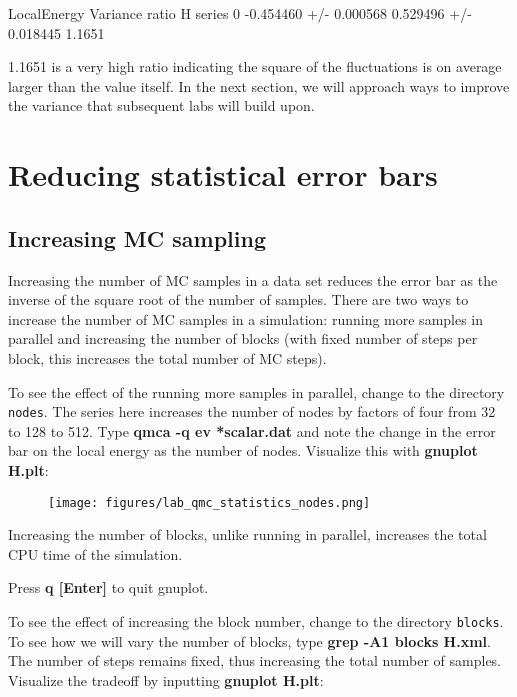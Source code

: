 \begin{shade}
                     LocalEnergy               Variance        ratio
H  series 0  -0.454460 +/- 0.000568   0.529496 +/- 0.018445   1.1651
\end{shade}

1.1651 is a very high ratio indicating the square of the fluctuations is on
average larger than the value itself.  In the next section, we will approach
ways to improve the variance that subsequent labs will build upon.  

\section{Reducing statistical error bars}

\subsection{Increasing MC sampling}

Increasing the number of MC samples in a data set reduces the error bar as the
inverse of the square root of the number of samples.  There are two ways to
increase the number of MC samples in a simulation: running more samples in
parallel and increasing the number of blocks (with fixed number of steps per
block, this increases the total number of MC steps).

To see the effect of the running more samples in parallel, change to the
directory \texttt{nodes}.  The series here increases the number of nodes by
factors of four from 32 to 128 to 512.  Type \textbf{qmca -q ev *scalar.dat}
and note the change in the error bar on the local energy as the number of
nodes.  Visualize this with \textbf{gnuplot H.plt}:

\FloatBarrier
\begin{figure}[ht!]
\begin{center}
\texttt{[image: figures/lab\_qmc\_statistics\_nodes.png]}
\end{center}
\end{figure}
\FloatBarrier


Increasing the number of blocks, unlike running in parallel, increases the
total CPU time of the simulation.  

Press \textbf{q [Enter]} to quit gnuplot.

To see the effect of increasing the block number, change to the directory
\texttt{blocks}. To see how we will vary the number of blocks, type
\textbf{grep -A1 blocks H.xml}.  The number of steps remains fixed, thus
increasing the total number of samples.   Visualize the tradeoff by inputting
\textbf{gnuplot H.plt}: 

